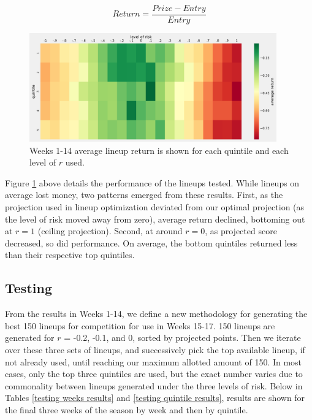 \documentclass[12pt]{article}
\begin{document}
\begin{equation}
	Return = \frac{Prize-Entry}{Entry} 
\label{lineup_return}
\end{equation}

\begin{figure}[H]
  \centering
  \includegraphics[width=0.95\textwidth]{../figures/testing_results}
  \caption{Weeks 1-14 average lineup return is shown for each quintile and each level of $r$ used.}
  \label{training results}
\end{figure}

Figure \ref{training results} above details the performance of the lineups tested. While lineups on average lost money, two patterns emerged from these results. First, as the projection used in lineup optimization deviated from our optimal projection (as the level of risk moved away from zero), average return declined, bottoming out at $r = 1$ (ceiling projection). Second, at around $r = 0$, as projected score decreased, so did performance. On average, the bottom quintiles returned less than their respective top quintiles.

\subsection{Testing}
From the results in Weeks 1-14, we define a new methodology for generating the best 150 lineups for competition for use in Weeks 15-17. 150 lineups are generated for $r$ = -0.2, -0.1, and 0, sorted by projected points. Then we iterate over these three sets of lineups, and successively pick the top available lineup, if not already used, until reaching our maximum allotted amount of 150. In most cases, only the top three quintiles are used, but the exact number varies due to commonality between lineups generated under the three levels of risk. Below in Tables \ref{testing weeks results} and \ref{testing quintile results}, results are shown for the final three weeks of the season by week and then by quintile. 
\end{document}
